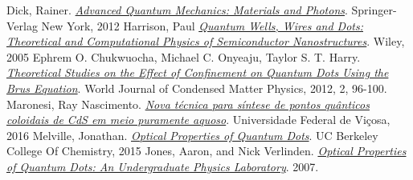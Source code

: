  Dick, Rainer. \href{http://www.springer.com/us/book/9781489990686}\textit{Advanced Quantum Mechanics: Materials and Photons}. Springer-Verlag New York, 2012
 Harrison, Paul \href{http://www.wiley.com/WileyCDA/WileyTitle/productCd-0470010819.html}\textit{Quantum Wells, Wires and Dots: Theoretical and Computational Physics of Semiconductor Nanostructures}. Wiley, 2005
 Ephrem O. Chukwuocha, Michael C. Onyeaju, Taylor S. T. Harry. \href{http://file.scirp.org/pdf/WJCMP20120200011_36451105.pdf}\textit{Theoretical Studies on the Effect of Confinement on Quantum Dots Using the Brus Equation}. World Journal of Condensed Matter Physics, 2012, 2, 96-100.
 Maronesi, Ray Nascimento. \href{http://www.locus.ufv.br/handle/123456789/9775}\textit{Nova técnica para síntese de pontos quânticos coloidais de CdS em meio puramente aquoso}. Universidade Federal de Viçosa, 2016
 Melville, Jonathan. \href{https://www.ocf.berkeley.edu/~jmlvll/lab-reports/quantumDots/quantumDots.pdf}\textit{Optical Properties of Quantum Dots}. UC Berkeley College Of Chemistry, 2015
 Jones, Aaron, and Nick Verlinden. \href{https://web.wpi.edu/Pubs/E-project/Available/E-project-042607-125225/unrestricted/QuantumDots.pdf}\textit{Optical Properties of Quantum Dots: An Undergraduate Physics Laboratory}. 2007.